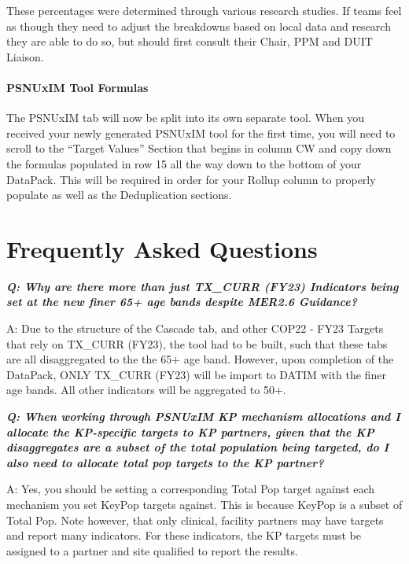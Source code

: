 \documentclass[
  openany]{book}
\begin{document}
These percentages were determined through various research studies. If teams feel as though they need to adjust the breakdowns based on local data and research they are able to do so, but should first consult their Chair, PPM and DUIT Liaison.

\hypertarget{psnuxim-tool-formulas}{%
\subsubsection{\texorpdfstring{\textbf{PSNUxIM Tool Formulas}}{PSNUxIM Tool Formulas}}\label{psnuxim-tool-formulas}}

The PSNUxIM tab will now be split into its own separate tool. When you received your newly generated PSNUxIM tool for the first time, you will need to scroll to the ``Target Values'' Section that begins in column CW and copy down the formulas populated in row 15 all the way down to the bottom of your DataPack. This will be required in order for your Rollup column to properly populate as well as the Deduplication sections.

\hypertarget{frequently-asked-questions}{%
\chapter{Frequently Asked Questions}\label{frequently-asked-questions}}

\textbf{\emph{Q: Why are there more than just TX\_CURR (FY23) Indicators being set at the new finer 65+ age bands despite MER2.6 Guidance?}}

A: Due to the structure of the Cascade tab, and other COP22 - FY23 Targets that rely on TX\_CURR (FY23), the tool had to be built, such that these tabs are all disaggregated to the the 65+ age band. However, upon completion of the DataPack, ONLY TX\_CURR (FY23) will be import to DATIM with the finer age bands. All other indicators will be aggregated to 50+.

\textbf{\emph{Q: When working through PSNUxIM KP mechanism allocations and I allocate the KP-specific targets to KP partners, given that the KP disaggregates are a subset of the total population being targeted, do I also need to allocate total pop targets to the KP partner?}}

A: Yes, you should be setting a corresponding Total Pop target against each mechanism you set KeyPop targets against. This is because KeyPop is a subset of Total Pop. Note however, that only clinical, facility partners may have targets and report many indicators. For these indicators, the KP targets must be assigned to a partner and site qualified to report the results.
\end{document}
